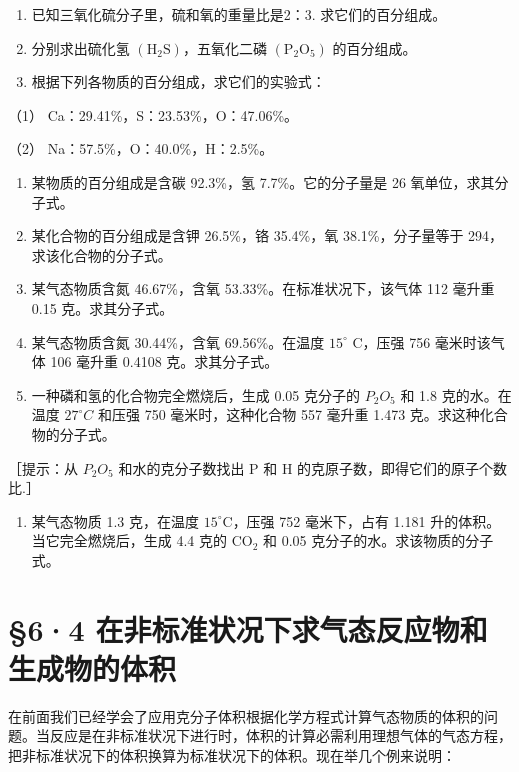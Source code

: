 \begin{enumerate}
\item
  已知三氧化硫分子里，硫和氧的重量比是2：3. 求它们的百分组成。
\item
  分别求出硫化氢 \(\left(\mathrm{H}_{2}\mathrm{S}\right)\)，五氧化二磷
  \(\left(\mathrm{P}_{2}\mathrm{O}_{5}\right)\) 的百分组成。
\item
  根据下列各物质的百分组成，求它们的实验式：
\end{enumerate}

（1） Ca：29.41\%，S：23.53\%，O：47.06\%。

（2） Na：57.5\%，O：40.0\%，H：2.5\%。

\begin{enumerate}[start=4]
\item
  某物质的百分组成是含碳 92.3\%，氢 7.7\%。它的分子量是 26
  氧单位，求其分子式。
\item
  某化合物的百分组成是含钾 26.5\%，铬 35.4\%，氧 38.1\%，分子量等于
  294，求该化合物的分子式。
\item
  某气态物质含氮 46.67\%，含氧 53.33\%。在标准状况下，该气体 112 毫升重
  0.15 克。求其分子式。
\item
  某气态物质含氮 30.44\%，含氧 69.56\%。在温度 \(15^{\circ}\) C，压强
  756 毫米时该气体 106 毫升重 0.4108 克。求其分子式。
\item
  一种磷和氢的化合物完全燃烧后，生成 0.05 克分子的 \(P_{2}O_{5}\) 和 1.8
  克的水。在温度 \(27^{\circ}C\) 和压强 750 毫米时，这种化合物 557
  毫升重 1.473 克。求这种化合物的分子式。
\end{enumerate}

［提示：从 \(P_{2}O_{5}\) 和水的克分子数找出 P 和 H
的克原子数，即得它们的原子个数比.］

\begin{enumerate}[start=9]
\item
  某气态物质 1.3 克，在温度 \(15^{\circ} \mathrm{C}\)，压强 752
  毫米下，占有 1.181 升的体积。当它完全燃烧后，生成 4.4 克的
  \(\mathrm{CO}_{2}\) 和 0.05 克分子的水。求该物质的分子式。
\end{enumerate}

\section{§6·4 在非标准状况下求气态反应物和生成物的体积}

在前面我们已经学会了应用克分子体积根据化学方程式计算气态物质的体积的问题。当反应是在非标准状况下进行时，体积的计算必需利用理想气体的气态方程，把非标准状况下的体积换算为标准状况下的体积。现在举几个例来说明：

